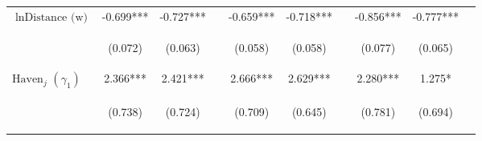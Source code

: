 \documentclass[twoside,a4paper,11pt]{article}
\begin{document}
\begin{table}
{\begin{tabular}{lccccccccc}
			 $\ln\text{Distance (w)}$ & -0.699*** & -0.727*** &  & -0.659*** & -0.718*** &  & -0.856*** & -0.777*** &  \\
			 \vspace{4pt} & \begin{footnotesize}(0.072)\end{footnotesize} & \begin{footnotesize}(0.063)\end{footnotesize} & \begin{footnotesize}\end{footnotesize} & \begin{footnotesize}(0.058)\end{footnotesize} & \begin{footnotesize}(0.058)\end{footnotesize} & \begin{footnotesize}\end{footnotesize} & \begin{footnotesize}(0.077)\end{footnotesize} & \begin{footnotesize}(0.065)\end{footnotesize} & \begin{footnotesize}\end{footnotesize} \\
			 $\text{Haven}_j$ $(\gamma_1)$ & 2.366*** & 2.421*** &  & 2.666*** & 2.629*** &  & 2.280*** & 1.275* &  \\
			 \vspace{4pt} & \begin{footnotesize}(0.738)\end{footnotesize} & \begin{footnotesize}(0.724)\end{footnotesize} & \begin{footnotesize}\end{footnotesize} & \begin{footnotesize}(0.709)\end{footnotesize} & \begin{footnotesize}(0.645)\end{footnotesize} & \begin{footnotesize}\end{footnotesize} & \begin{footnotesize}(0.781)\end{footnotesize} & \begin{footnotesize}(0.694)\end{footnotesize} & \begin{footnotesize}\end{footnotesize} \\

\end{tabular}}
\end{table}
\end{document}
